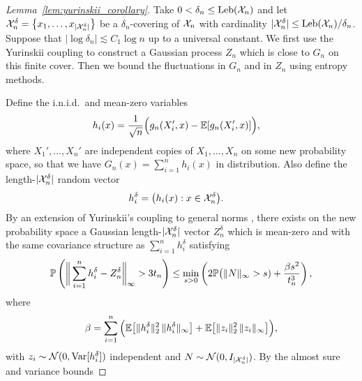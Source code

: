 \begin{proof}[Lemma~\ref{lem:yurinskii_corollary}]

  Take $0 < \delta_n \leq \Leb(\cX_n)$ and let
  $\cX_n^\delta = \big\{ x_1, \dots, x_{|\cX_n^\delta|}\big\}$
  be a $\delta_n$-covering of $\cX_n$ with cardinality
  $|\cX_n^\delta| \leq \Leb(\cX_n)/\delta_n$.
  Suppose that $\left|\log \delta_n\right| \lesssim C_1 \log n$
  up to a universal constant.
  We first use the Yurinskii coupling to
  construct a Gaussian process
  $Z_n$
  which is close to $G_n$
  on this finite cover.
  Then we bound the fluctuations in $G_n$
  and in $Z_n$
  using entropy methods.


  Define the i.n.i.d.\
  and mean-zero variables
  \begin{align*}
    h_i(x)
    &=
    \frac{1}{\sqrt n}
    \Big(
      g_n(X_i', x)
      - \E[g_n(X_i', x)]
    \Big),
  \end{align*}
  where $X_1', \ldots, X_n'$
  are independent copies of $X_1, \ldots, X_n$
  on some new probability space,
  so that we have
  $G_n(x) = \sum_{i=1}^n h_i(x)$
  in distribution.
  Also define the length-$|\cX_n^\delta|$ random vector
  \begin{align*}
    h_i^\delta
    &=
    \big(
      h_i(x): x \in \cX_n^\delta
    \big).
  \end{align*}
  By an extension of
  Yurinskii's coupling
  to general norms
  \citep[supplemental materials, Lemma~38]{belloni2019conditional},
  there exists on the new probability space a
  Gaussian length-$|\cX_n^\delta|$ vector $Z_n^\delta$
  which is mean-zero
  and with the same covariance structure as
  $
  \sum_{i=1}^n
  h_i^\delta
  $
  satisfying
  \begin{align*}
    \P\left(
      \bigg\|
      \sum_{i=1}^n
      h_i^\delta
      - Z_n^\delta
      \bigg\|_\infty
      > 3 t_n
    \right)
    \leq
    \min_{s > 0}
    \left(
      2 \P\big( \|N\|_\infty > s)
      + \frac{\beta s^2}{t_n^3}
    \right),
  \end{align*}
  where
  \begin{align*}
    \beta
    = \sum_{i=1}^n
    \Big(
      \E\big[\|h_i^\delta\|_2^2 \,
        \|h_i^\delta\|_\infty
      \big]
      + \E\big[\|z_i\|_2^2 \,
        \|z_i\|_\infty
      \big]
    \Big),
  \end{align*}
  with
  $z_i \sim \cN(0, \Var[h_i^\delta])$
  independent and
  $N \sim \cN(0, I_{|\cX_n^\delta|})$.
  By the almost sure
  and variance bounds

\end{proof}
